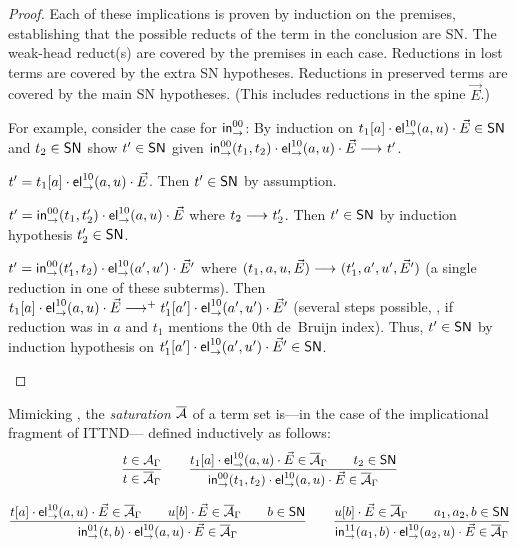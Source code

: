 \begin{proof}
  Each of these implications is proven by induction on the premises,
  establishing that the possible reducts of the term in the conclusion
  are SN.
  The weak-head reduct(s) are covered by the premises in each case.
  Reductions in lost terms are covered by the extra SN hypotheses.
  Reductions in preserved terms are covered by the main SN hypotheses.
  (This includes reductions in the spine $\vec E$.)


  For example, consider the case for $\mathsf{in}_{\to}^{00}$:
  By induction on $t_1[a] \cdot \mathsf{el}_{\to}^{10}(a,u) \cdot \vec E \in \mathsf{SN}$
  and $t_2 \in \mathsf{SN}$ show $t' \in \mathsf{SN}$ given
  $\mathsf{in}_{\to}^{00}(t_1,t_2) \cdot \mathsf{el}_{\to}^{10}(a,u) \cdot \vec E \longrightarrow_{} t'$.
  \begin{caselist}

  \nextcase
  $t' = t_1[a] \cdot \mathsf{el}_{\to}^{10}(a,u) \cdot \vec E$.
  Then $t' \in \mathsf{SN}$ by assumption.

  \nextcase
  $t' = \mathsf{in}_{\to}^{00}(t_1,t_2') \cdot \mathsf{el}_{\to}^{10}(a,u) \cdot \vec E$
  where $t_2 \longrightarrow_{} t_2'$.
  Then $t' \in \mathsf{SN}$ by induction hypothesis $t_2' \in \mathsf{SN}$.

  \nextcase
  $t' = \mathsf{in}_{\to}^{00}(t_1',t_2) \cdot \mathsf{el}_{\to}^{10}(a',u') \cdot \vec E'$
  where $(t_1,a,u,\vec E) \longrightarrow_{} (t_1',a',u',\vec E')$ (a single
  reduction in one of these subterms).
  Then $t_1[a] \cdot \mathsf{el}_{\to}^{10}(a,u) \cdot \vec E \longrightarrow_{}^+
  t_1'[a'] \cdot \mathsf{el}_{\to}^{10}(a',u') \cdot \vec E'$ (several steps
  possible, \eg, if reduction was in $a$ and $t_1$ mentions the 0th
  de~Bruijn index).
  Thus, $t' \in \mathsf{SN}$ by induction hypothesis on
  $t_1'[a'] \cdot \mathsf{el}_{\to}^{10}(a',u') \cdot \vec E' \in \mathsf{SN}$.
  \popQED
  \end{caselist}
\end{proof}


Mimicking ,
the \emph{saturation} $\overline{\mathcal{A}}$ of a term set is---in the case of the
implicational fragment of ITTND--- defined inductively as follows:
\begin{gather*}
  \dfrac{t \in \mathcal{A}_\Gamma
    }{t \in \overline{\mathcal{A}}_\Gamma}
\qquad
  \dfrac{t_1[a] \cdot \mathsf{el}_{\to}^{10}(a,u) \cdot \vec E \in \overline{\mathcal{A}}_\Gamma
      \qquad
      t_2 \in \mathsf{SN}
    }{\mathsf{in}_{\to}^{00}(t_1,t_2) \cdot \mathsf{el}_{\to}^{10}(a,u) \cdot \vec E \in \overline{\mathcal{A}}_\Gamma}
\\[2ex]
  \dfrac{t[a] \cdot \mathsf{el}_{\to}^{10}(a,u) \cdot \vec E \in \overline{\mathcal{A}}_\Gamma
      \qquad
      u[b] \cdot \vec E \in \overline{\mathcal{A}}_\Gamma
      \qquad
      b \in \mathsf{SN}
    }{\mathsf{in}_{\to}^{01}(t,b) \cdot \mathsf{el}_{\to}^{10}(a,u) \cdot \vec E \in \overline{\mathcal{A}}_\Gamma}
\qquad
  \dfrac{u[b] \cdot \vec E \in \overline{\mathcal{A}}_\Gamma
      \qquad
      a_1,a_2,b \in \mathsf{SN}
    }{\mathsf{in}_{\to}^{11}(a_1,b) \cdot \mathsf{el}_{\to}^{10}(a_2,u) \cdot \vec E \in \overline{\mathcal{A}}_\Gamma}
\end{gather*}


